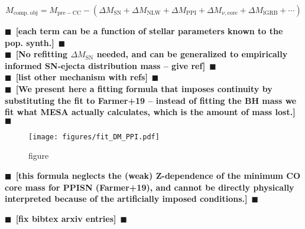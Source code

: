 \documentclass[twocolumn]{aastex63}
\newcommand{\todo}[1]{{\large $\blacksquare$~\textbf{\color{red}[#1]}}~$\blacksquare$}
\begin{document}
\begin{equation}
  \label{eq:mass}
  M_\mathrm{comp.\ obj} = M_\mathrm{pre-CC} - \left(\Delta M_\mathrm{SN} + \Delta M_\mathrm{NLW} + \Delta M_\mathrm{PPI} + \Delta M_{\nu, \mathrm{core}} +\Delta M_\mathrm{lGRB} + \cdots \right)
\end{equation}

\todo{each term can be a function of stellar parameters known to the
  pop. synth.}\\

\todo{No refitting $\Delta M_\mathrm{SN}$ needed, and can be
  generalized to empirically informed SN-ejecta distribution mass --
  give ref}\\

\todo{list other mechanism with refs}\\

\todo{We present here a fitting formula that imposes continuity by
  substituting the fit to Farmer+19 -- instead of fitting the BH mass
  we fit what MESA actually calculates, which is the amount of mass
  lost.}

\begin{figure}[ht!]
    \begin{centering}
      \texttt{[image: figures/fit\_DM\_PPI.pdf]}
        \caption{figure }
        \label{fig:fit_DM_PPI}
    \end{centering}
\end{figure}

\todo{this formula neglects the (weak) Z-dependence of the minimum CO
  core mass for PPISN (Farmer+19), and cannot be directly physically
  interpreted because of the artificially imposed conditions.}

\todo{fix bibtex arxiv entries}
% 

\end{document}
